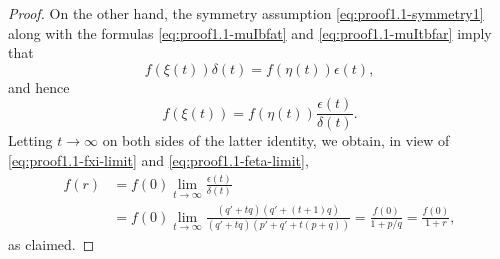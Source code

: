 \documentclass[10pt,a4paper]{amsart}
\begin{document}
\begin{proof}
On the other hand, the symmetry assumption \eqref{eq:proof1.1-symmetry1}
along with the formulas \eqref{eq:proof1.1-muIbfat}
and \eqref{eq:proof1.1-muItbfar} imply that 
\begin{equation*}
f(\xi(t)) \delta(t)= f(\eta(t))\epsilon(t),
\end{equation*}
and hence 
\begin{equation*}
f(\xi(t))=f(\eta(t))\frac{\epsilon(t)}{\delta(t)}.
\end{equation*}
Letting $t\to\infty$ on both sides of the latter identity, we obtain, in
view of \eqref{eq:proof1.1-fxi-limit} and
\eqref{eq:proof1.1-feta-limit}, 
\begin{align*}
f(r)&=f(0)\lim_{t\to\infty}\frac{\epsilon(t)}{\delta(t)}
\\
&=f(0)\lim_{t\to\infty}
\frac{(q'+tq)(q'+(t+1)q)}
{(q'+tq)(p'+q'+t(p+q))}
=\frac{f(0)}{1+p/q}=\frac{f(0)}{1+r},
\end{align*}
as claimed.
\end{proof}
\end{document}
